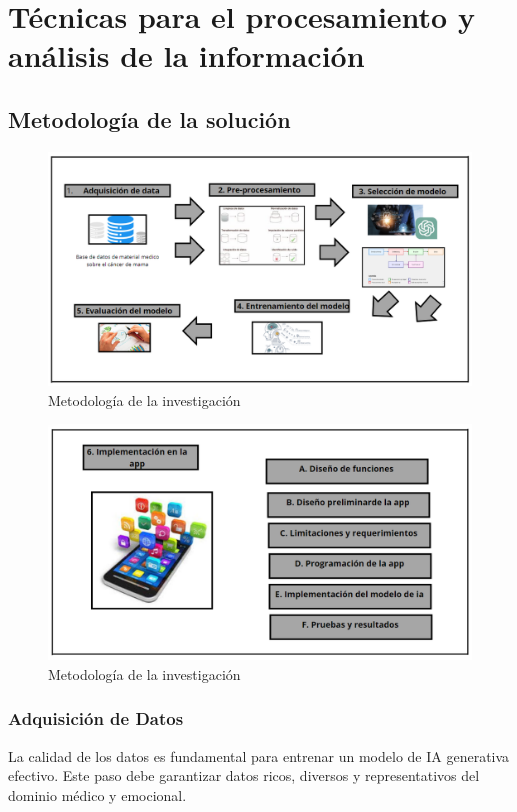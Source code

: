 \section{Técnicas para el procesamiento y análisis de la información}
\subsection{Metodología de la solución}
\begin{figure}[ht]
	\centering
	\includegraphics[width=\textwidth]{3/figures/MIsolucion.png}
	\caption{Metodología de la investigación}
	\label{14:fig}
\end{figure}
\begin{figure}[ht]
	\centering
	\includegraphics[width=\textwidth]{3/figures/MI2.png}
	\caption{Metodología de la investigación}
	\label{14:fig}
\end{figure}

\subsubsection{Adquisición de Datos}
La calidad de los datos es fundamental para entrenar un modelo de IA generativa efectivo. Este paso debe garantizar datos ricos, diversos y representativos del dominio médico y emocional.

